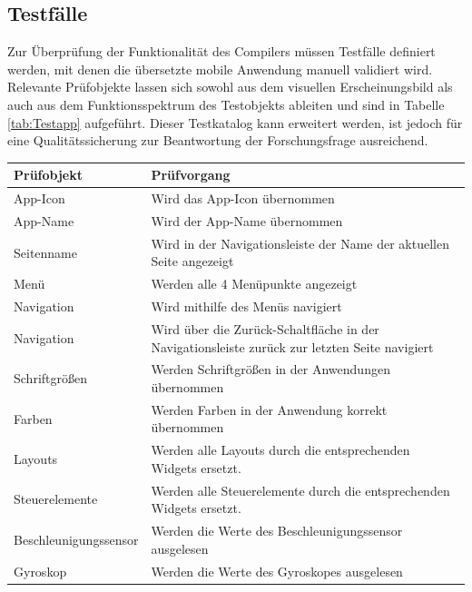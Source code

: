 \subsection{Testfälle}
Zur Überprüfung der Funktionalität des Compilers müssen Testfälle definiert werden,  mit denen die übersetzte mobile Anwendung manuell validiert wird.  Relevante Prüfobjekte lassen sich sowohl aus dem visuellen  Erscheinungsbild als auch aus dem Funktionsspektrum des Testobjekts ableiten und sind in Tabelle \ref{tab:Testapp} aufgeführt.  Dieser Testkatalog kann erweitert werden,  ist jedoch für eine Qualitätssicherung zur Beantwortung der Forschungsfrage ausreichend.  
\newpage

\begin{table}[!ht]
\begin{tabularx}{\textwidth}{|l|X|}
\hline
 \textbf{Prüfobjekt} & \textbf{Prüfvorgang}  \\  
\hline
App-Icon	           					& Wird das App-Icon übernommen                       			 		\\ 
App-Name          					& Wird der App-Name übernommen                      		 \\ 
Seitenname  	         				& Wird in der Navigationsleiste der Name der aktuellen Seite angezeigt               \\ 
Menü         			  				& Werden alle 4 Menüpunkte angezeigt                     			 \\ 
Navigation         			  		& Wird mithilfe des Menüs navigiert	\\ 
Navigation          					& Wird über die Zurück-Schaltfläche in der Navigationsleiste zurück zur letzten Seite navigiert                   			 \\ 
Schriftgrößen			         	& Werden  Schriftgrößen in der Anwendungen übernommen                 			 \\ 
Farben						         	& Werden  Farben in der Anwendung korrekt übernommen                 			 \\ 
Layouts 								& Werden alle Layouts durch die entsprechenden Widgets ersetzt.                 			 \\ 
Steuerelemente						& Werden alle Steuerelemente durch die entsprechenden Widgets ersetzt.                 			 \\ 
Beschleunigungssensor        	& Werden die Werte des Beschleunigungssensor ausgelesen          			 \\ 
Gy­ro­s­kop						         & Werden die Werte des Gyroskopes ausgelesen                            			 \\ 

\end{tabularx}
\end{table}
